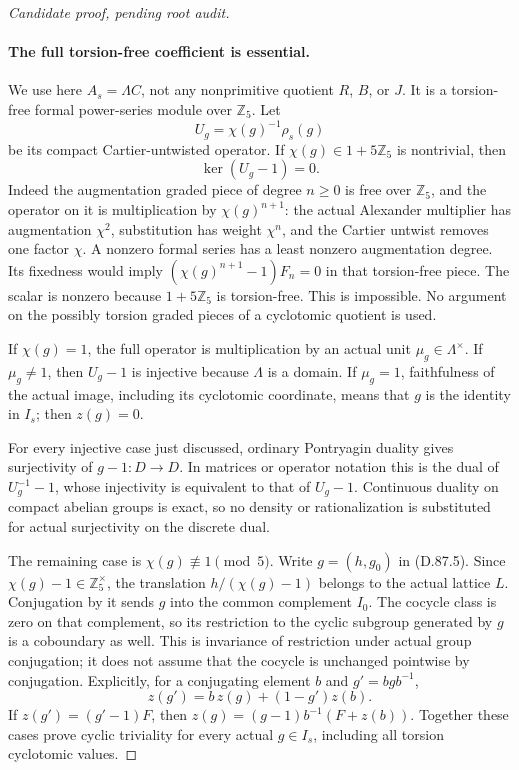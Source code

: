 \begin{proof}[Candidate proof, pending root audit]
\paragraph{The full torsion-free coefficient is essential.}
We use here \(A_s=\Lambda C\), not any nonprimitive quotient
\(R\), \(B\), or \(J\). It is a torsion-free formal power-series
module over \(\mathbb Z_5\). Let
\[
                     U_g=\chi(g)^{-1}\rho_s(g)
\]
be its compact Cartier-untwisted operator. If
\(\chi(g)\in1+5\mathbb Z_5\) is nontrivial, then
\[
                         \ker(U_g-1)=0.               \tag{D.87.6}
\]
Indeed the augmentation graded piece of degree \(n\ge0\)
is free over \(\mathbb Z_5\), and the operator on it is
multiplication by \(\chi(g)^{n+1}\): the actual Alexander
multiplier has augmentation \(\chi^2\), substitution has
weight \(\chi^n\), and the Cartier untwist removes one
factor \(\chi\). A nonzero formal series has a least
nonzero augmentation degree. Its fixedness would imply
\((\chi(g)^{n+1}-1)F_n=0\) in that torsion-free piece.
The scalar is nonzero because \(1+5\mathbb Z_5\) is
torsion-free. This is impossible. No argument on the possibly
torsion graded pieces of a cyclotomic quotient is used.

If \(\chi(g)=1\), the full operator is multiplication by
an actual unit \(\mu_g\in\Lambda^\times\). If
\(\mu_g\ne1\), then \(U_g-1\) is injective because
\(\Lambda\) is a domain. If \(\mu_g=1\), faithfulness
of the actual image, including its cyclotomic coordinate,
means that \(g\) is the identity in \(I_s\); then
\(z(g)=0\).

For every injective case just discussed, ordinary Pontryagin
duality gives surjectivity of \(g-1:D\to D\). In matrices
or operator notation this is the dual of
\(U_g^{-1}-1\), whose injectivity is equivalent to that of
\(U_g-1\). Continuous duality on compact abelian groups is
exact, so no density or rationalization is substituted for
actual surjectivity on the discrete dual.

The remaining case is \(\chi(g)\not\equiv1\pmod5\).
Write \(g=(h,g_0)\) in (D.87.5). Since
\(\chi(g)-1\in\mathbb Z_5^\times\), the translation
\(h/(\chi(g)-1)\) belongs to the actual lattice \(L\).
Conjugation by it sends \(g\) into the common complement
\(I_0\). The cocycle class is zero on that complement,
so its restriction to the cyclic subgroup generated by
\(g\) is a coboundary as well. This is invariance of
restriction under actual group conjugation; it does not
assume that the cocycle is unchanged pointwise by conjugation.
Explicitly, for a conjugating element \(b\) and
\(g'=bgb^{-1}\),
\[
 z(g')=b\,z(g)+(1-g')z(b).
\]
If \(z(g')=(g'-1)F\), then
\(z(g)=(g-1)b^{-1}(F+z(b))\).
Together these cases prove cyclic triviality for every actual
\(g\in I_s\), including all torsion cyclotomic values.


\end{proof}
